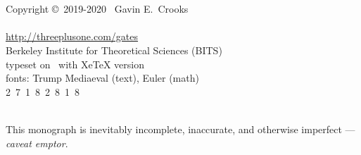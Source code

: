 

~
\vfill
{\center
~\\~\\
Copyright \copyright~2019-2020~ Gavin E.\ Crooks~\\
~ %
\\
\url{http://threeplusone.com/gates} 
\\
Berkeley Institute for Theoretical Sciences (BITS)
\\
typeset on \isotoday~with XeTeX version \the\XeTeXversion\XeTeXrevision
\\
fonts: Trump Mediaeval (text), Euler (math)
\\
  2~7~1~8~2~8~1~8
\\
~ 
\\
}

This monograph is inevitably incomplete, inaccurate, and otherwise imperfect --- \emph{caveat emptor}.
